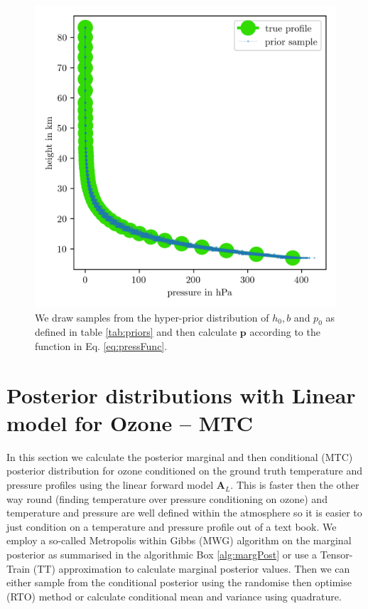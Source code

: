 \begin{figure}[ht!]
	\centering
	\includegraphics{PriorPressPostMeanSigm.png}
	\caption[Prior Samples of $\bm{p}$ according to the respective hyper-prior distribution.]{We draw samples from the hyper-prior distribution of $h_0, b$ and $p_0$ as defined in table \ref{tab:priors} and then calculate $\bm{p}$ according to the function in Eq. \ref{eq:pressFunc}.}
	\label{fig:PriorPress}
\end{figure}

\clearpage


\section{Posterior distributions with Linear model for Ozone -- MTC}
\label{sec:firstMTC}
In this section we calculate the posterior marginal and then conditional (MTC) posterior distribution for ozone conditioned on the ground truth temperature and pressure profiles using the linear forward model $\bm{A}_L$.
This is faster then the other way round (finding temperature over pressure conditioning on ozone) and temperature and pressure are well defined within the atmosphere so it is easier to just condition on a temperature and pressure profile out of a text book.
We employ a so-called Metropolis within Gibbs (MWG) algorithm on the marginal posterior as summarised in the algorithmic Box \ref{alg:margPost} or use a Tensor-Train (TT) approximation to calculate marginal posterior values.
Then we can either sample from the conditional posterior using the randomise then optimise (RTO) method or calculate conditional mean and variance using quadrature.

